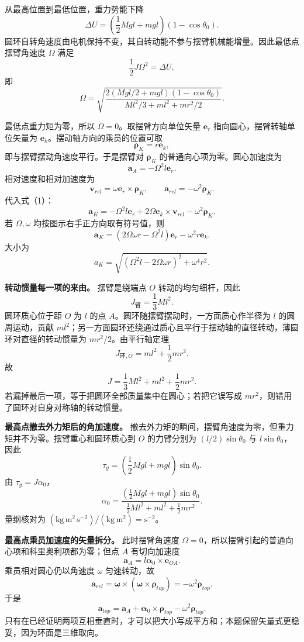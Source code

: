 \documentclass[12pt,a4paper,UTF8]{ctexart}
\begin{document}
从最高位置到最低位置，重力势能下降 \[
\Delta U=\left(\frac12Mgl+mgl\right)(1-\cos\theta_0). \tag{7}
\]
圆环自转角速度由电机保持不变，其自转动能不参与摆臂机械能增量。因此最低点摆臂角速度
\(\Omega\) 满足 \[
\frac12J\Omega^2=\Delta U, \tag{8}
\] 即 \[
\boxed{
\Omega=\sqrt{
\frac{2(Mgl/2+mgl)(1-\cos\theta_0)}
{Ml^2/3+ml^2+mr^2/2}}
}. \tag{9}
\]

最低点重力矩为零，所以 \(\dot\Omega=0\)。取摆臂方向单位矢量
\(\boldsymbol e_r\) 指向圆心，摆臂转轴单位矢量为
\(\boldsymbol e_k\)。摆动轴方向的乘员的位置可取 \[
\boldsymbol\rho_K=r\boldsymbol e_k, \tag{10}
\] 即与摆臂摆动角速度平行。于是摆臂对 \(\boldsymbol\rho_K\)
的普通向心项为零。圆心加速度为 \[
\boldsymbol a_A=-\Omega^2l\boldsymbol e_r. \tag{11}
\] 相对速度和相对加速度为 \[
\boldsymbol v_{rel}=\omega\boldsymbol e_r\times\boldsymbol\rho_K,
\qquad
\boldsymbol a_{rel}=-\omega^2\boldsymbol\rho_K. \tag{12}
\] 代入式（1）： \[
\boxed{
\boldsymbol a_K
=-\Omega^2l\boldsymbol e_r
+2\Omega\boldsymbol e_k\times\boldsymbol v_{rel}
-\omega^2\boldsymbol\rho_K
}. \tag{13}
\] 若 \(\Omega,\omega\) 均按图示右手正方向取有符号值，则 \[
\boldsymbol a_K
=(2\Omega\omega r-\Omega^2l)\boldsymbol e_r
-\omega^2r\boldsymbol e_k. \tag{14}
\] 大小为 \[
\boxed{
a_K=\sqrt{(\Omega^2l-2\Omega\omega r)^2+\omega^4r^2}
}. \tag{15}
\]

\textbf{转动惯量每一项的来由。} 摆臂是绕端点 \(O\) 转动的均匀细杆，因此
\[
J_{\text{臂}}=\frac13Ml^2.
\] 圆环质心位于距 \(O\) 为 \(l\) 的点
\(A\)。圆环随摆臂摆动时，一方面质心作半径为 \(l\) 的圆周运动，贡献
\(ml^2\)；另一方面圆环还绕通过质心且平行于摆动轴的直径转动，薄圆环对直径的转动惯量为
\(mr^2/2\)。由平行轴定理 \[
J_{\text{环},O}=ml^2+\frac12mr^2.
\] 故 \[
J=\frac13Ml^2+ml^2+\frac12mr^2.
\] 若漏掉最后一项，等于把圆环全部质量集中在圆心；若把它误写成
\(mr^2\)，则错用了圆环对自身对称轴的转动惯量。

\textbf{最高点撤去外力矩后的角加速度。}
撤去外力矩的瞬间，摆臂角速度为零，但重力矩并不为零。摆臂重心和圆环质心到
\(O\) 的力臂分别为 \((l/2)\sin\theta_0\) 与 \(l\sin\theta_0\)，因此 \[
\tau_g=\left(\frac12Mgl+mgl\right)\sin\theta_0.
\] 由 \(\tau_g=J\alpha_0\)， \[
\alpha_0=
\frac{\left(\frac12Mgl+mgl\right)\sin\theta_0}
{\frac13Ml^2+ml^2+\frac12mr^2}.
\] 量纲核对为
\((\mathrm{kg\,m^2\,s^{-2}})/(\mathrm{kg\,m^2})=\mathrm{s^{-2}}\)。

\textbf{最高点乘员加速度的矢量拆分。} 此时摆臂角速度
\(\Omega=0\)，所以摆臂引起的普通向心项和科里奥利项都为零；但点 \(A\)
有切向加速度 \[
\boldsymbol a_A=l\boldsymbol\alpha_0\times\boldsymbol e_{OA}.
\] 乘员相对圆心仍以角速度 \(\omega\) 匀速转动，故 \[
\boldsymbol a_{rel}
=\boldsymbol\omega\times
(\boldsymbol\omega\times\boldsymbol\rho_{top})
=-\omega^2\boldsymbol\rho_{top}.
\] 于是 \[
\boldsymbol a_{top}=\boldsymbol a_A+\boldsymbol\alpha_0\times\boldsymbol\rho_{top}-\omega^2\boldsymbol\rho_{top}.
\]
只有在已经证明两项互相垂直时，才可以把大小写成平方和；本题保留矢量式更稳妥，因为环面是三维取向。
\end{document}
